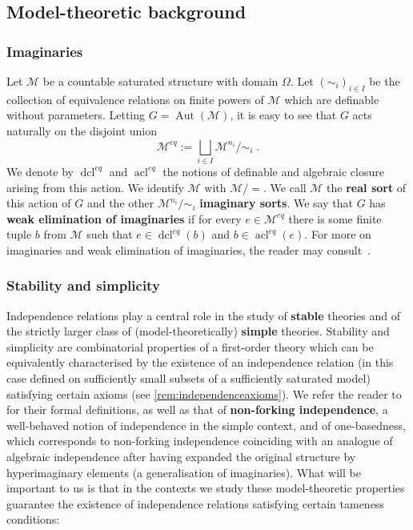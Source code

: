 \documentclass{article}
\theoremstyle{remark}
\theoremstyle{definition}
\DeclareMathOperator{\acl}{acl}
\DeclareMathOperator{\dcl}{dcl}
\DeclareMathOperator{\Aut}{Aut}
\newcommand{\M}[0]{\mathcal{M}}
\begin{document}
{{{{{\subsection{Model-theoretic background}\label{sub:modelbackground}

\subsubsection{Imaginaries}

{Let $\M$ be a countable saturated structure with domain $\Omega$. Let $(\sim_i)_{i\in I}$ be the collection of equivalence relations on finite powers of $\M$ which are definable without parameters. Letting $G=\Aut(\M)$, it is easy to see that $G$ acts naturally on the disjoint union}
\[{\M^{eq}:=\bigsqcup_{i\in I} \M^{n_i}/\sim_i}\;.\]
We denote by $\dcl^{eq}$ and $\acl^{eq}$ the notions of definable and algebraic closure arising from this action. {We identify $\M$ with $\M/=$. %
We call %
$\M$ the \textbf{real sort} of this action of $G$ and the other $\M^{n_i}/\sim_i$ 
\textbf{imaginary sorts}. We say that $G$ has \textbf{weak elimination of imaginaries} if for every %
$e\in\M^{eq}$
there is some finite tuple $b$ from %
$\M$ such that $e\in\dcl^{eq}(b)$ and $b\in\acl^{eq}(e)$. For more on imaginaries and weak elimination of imaginaries, the reader may consult~\cite[$\S$ 16]{poizat2000course}.}

\subsubsection{Stability and simplicity}

Independence relations play a central role in the study of \textbf{stable} theories and of the strictly larger class of (model-theoretically) \textbf{simple} theories. Stability and simplicity are combinatorial properties of a first-order theory which can be equivalently characterised by the existence of an independence relation (in this case defined on sufficiently small subsets of a sufficiently saturated model) satisfying certain axioms (see \cref{rem:independenceaxioms}). We refer the reader to~\cite{tent2012course} for their formal definitions, as well as that of \textbf{non-forking independence}, a well-behaved notion of independence in the simple context, and of one-basedness, which corresponds to non-forking independence coinciding with an analogue of algebraic independence after having expanded the original structure by hyperimaginary elements (a generalisation of imaginaries). What will be important to us is that in the contexts we study these model-theoretic properties guarantee the existence of independence relations satisfying certain tameness conditions:



}}}}}
\end{document}
